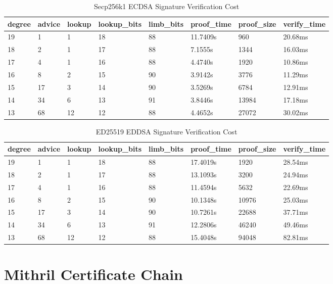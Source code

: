 \documentclass{article}
\begin{document}
\begin{table}[H]
    \centering
    \begin{tabular}{p{1cm}|p{1cm}|p{1cm}|p{2cm}|p{1.5cm}|p{1.5cm}|p{1.5cm}|p{1.5cm}} \hline
          degree&advice&lookup&lookup\_bits&limb\_bits&proof\_time&proof\_size&verify\_time \\ \hline
19&1&1&18&88&11.7409s&960&20.68ms \\ \hline
18&2&1&17&88&7.1555s&1344&16.03ms\\ \hline
17&4&1&16&88&4.4740s&1920&10.86ms\\ \hline
16&8&2&15&90&3.9142s&3776&11.29ms\\ \hline
15&17&3&14&90&3.5269s&6784&12.91ms\\ \hline
14&34&6&13&91&3.8446s&13984&17.18ms\\ \hline
13&68&12&12&88&4.4652s&27072&30.02ms\\ \hline

    \end{tabular}
    \caption{Secp256k1 ECDSA Signature Verification Cost}
    \label{tab:my_label}
\end{table}


\begin{table}[H]
    \centering
    \begin{tabular}{p{1cm}|p{1cm}|p{1cm}|p{2cm}|p{1.5cm}|p{1.5cm}|p{1.5cm}|p{1.5cm}} \hline
          degree&advice&lookup&lookup\_bits&limb\_bits&proof\_time&proof\_size&verify\_time \\ \hline
19&1&1&18&88&17.4019s&1920&28.54ms  \\ \hline
18&2&1&17&88&13.1093s&3200&24.94ms \\ \hline
17&4&1&16&88&11.4594s&5632&22.69ms \\ \hline
16&8&2&15&90&10.1348s&10976&25.03ms \\ \hline
15&17&3&14&90&10.7261s&22688&37.71ms \\ \hline
14&34&6&13&91&12.2806s&46240&49.46ms \\ \hline
13&68&12&12&88&15.4048s&94048&82.81ms \\ \hline


    \end{tabular}
    \caption{ED25519 EDDSA Signature Verification Cost}
    \label{tab:my_label}
\end{table}


\section{Mithril Certificate Chain}
\end{document}
